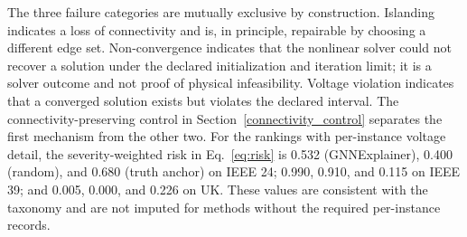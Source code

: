 The three failure categories are mutually exclusive by construction. Islanding indicates a loss of connectivity and is, in principle, repairable by choosing a different edge set. Non-convergence indicates that the nonlinear solver could not recover a solution under the declared initialization and iteration limit; it is a solver outcome and not proof of physical infeasibility. Voltage violation indicates that a converged solution exists but violates the declared interval. The connectivity-preserving control in Section~\ref{connectivity_control} separates the first mechanism from the other two. For the rankings with per-instance voltage detail, the severity-weighted risk in Eq.~\eqref{eq:risk} is 0.532 (GNNExplainer), 0.400 (random), and 0.680 (truth anchor) on IEEE 24; 0.990, 0.910, and 0.115 on IEEE 39; and 0.005, 0.000, and 0.226 on UK. These values are consistent with the taxonomy and are not imputed for methods without the required per-instance records.

